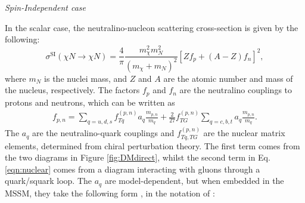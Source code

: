 \begin{enumerate}
\textit{Spin-Independent case}

In the scalar case, the neutralino-nucleon scattering cross-section is given by the following:
\begin{equation}
\sigma^{\text{SI}}(\chi N \rightarrow \chi N) = \frac{4}{\pi}\frac{m^2_{\chi} m^2_N}{(m_{\chi} + m_N)^2}[Zf_p + (A-Z)f_n]^2,
\end{equation}
where $m_N$ is the nuclei mass, and $Z$ and $A$ are the atomic number and mass of the nucleus, respectively. The factors $f_p$ and $f_n$ are the neutralino couplings to protons and neutrons, which can be written as
\begin{eqnarray}
f_{p,n}=\sum_{q=u,d,s} f^{(p,n)}_{Tq} a_q \frac{m_{p,n}}{m_q} + \frac{2}{27} f^{(p,n)}_{TG} \sum_{q=c,b,t} a_q \frac{m_{p,n}}{m_q}.
\label{eqn:nuclear}
\end{eqnarray}
The $a_q$ are the neutralino-quark couplings and $f^{(p,n)}_{Tq,TG}$ are the nuclear matrix elements, determined from chiral perturbation theory. The first term comes from the two diagrams in Figure \ref{fig:DMdirect}, whilst the second term in Eq. \ref{eqn:nuclear} comes from a diagram interacting with gluons through a quark/squark loop. The $a_q$ are model-dependent, but when embedded in the MSSM, they take the following form \cite{RN651,RN652,RN653,RN654,RN655}, in the notation of \cite{RN650}:


\end{enumerate}

